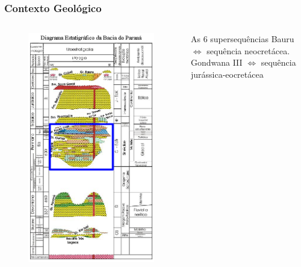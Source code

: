 \documentclass[10pt]{beamer} %
\begin{document}
\begin{frame}
	\frametitle{Contexto Geológico}
	\begin{columns}
		\begin{column}{0.4\textwidth}
			\begin{figure}
				\includegraphics[scale=0.36]{Imagens/diagramagondwanai.png}
			\end{figure}
		\end{column}
		\begin{column}{0.75\textwidth}
			\begin{block}{As $6$ supersequências}
				Bauru $\Longleftrightarrow$  sequência neocretácea.\\
				Gondwana III $\Longleftrightarrow$ sequência jurássica-eocretácea\\

\end{block}
\end{column}
\end{columns}
\end{frame}
\end{document}
